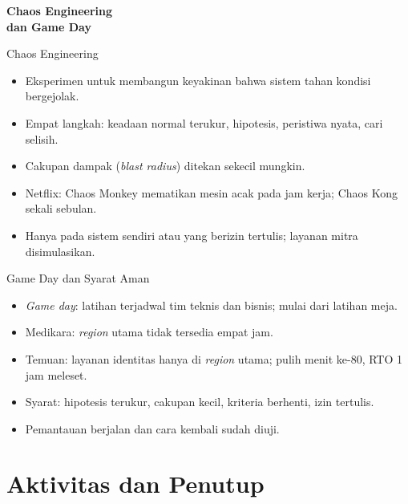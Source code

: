 \documentclass[aspectratio=169, table, 12pt]{beamer}
\begin{document}
\begin{frame}{\hfill}
  \centering
  \Huge{\textbf{Chaos Engineering\\dan Game Day}}
\end{frame}

\begin{frame}{{\Large Chaos Engineering}}
  \vspace{6pt}
  \small
  \begin{itemize}
    \item Eksperimen untuk membangun keyakinan bahwa sistem tahan kondisi bergejolak.
    \item Empat langkah: keadaan normal terukur, hipotesis, peristiwa nyata, cari selisih.
    \item Cakupan dampak (\textit{blast radius}) ditekan sekecil mungkin.
    \item Netflix: Chaos Monkey mematikan mesin acak pada jam kerja; Chaos Kong sekali sebulan.
    \item Hanya pada sistem sendiri atau yang berizin tertulis; layanan mitra disimulasikan.
  \end{itemize}
\end{frame}

\begin{frame}{{\Large Game Day dan Syarat Aman}}
  \vspace{6pt}
  \small
  \begin{itemize}
    \item \textit{Game day}: latihan terjadwal tim teknis dan bisnis; mulai dari latihan meja.
    \item Medikara: \textit{region} utama tidak tersedia empat jam.
    \item Temuan: layanan identitas hanya di \textit{region} utama; pulih menit ke-80, RTO 1 jam
          meleset.
    \item Syarat: hipotesis terukur, cakupan kecil, kriteria berhenti, izin tertulis.
    \item Pemantauan berjalan dan cara kembali sudah diuji.
  \end{itemize}
\end{frame}

\section{Aktivitas dan Penutup}
\end{document}

